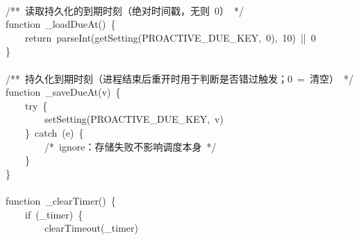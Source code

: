 \documentclass[a4paper,10pt]{article}
\begin{document}
{\mbox{}\\
/**~读取持久化的到期时刻（绝对时间戳，无则~0）~*/\\
function~\_loadDueAt()~\{\\
~~~~return~parseInt(getSetting(PROACTIVE\_DUE\_KEY,~0),~10)~||~0\\
\}\\
\mbox{}\\
/**~持久化到期时刻（进程结束后重开时用于判断是否错过触发；0~=~清空）~*/\\
function~\_saveDueAt(v)~\{\\
~~~~try~\{\\
~~~~~~~~setSetting(PROACTIVE\_DUE\_KEY,~v)\\
~~~~\}~catch~(e)~\{\\
~~~~~~~~/*~ignore：存储失败不影响调度本身~*/\\
~~~~\}\\
\}\\
\mbox{}\\
function~\_clearTimer()~\{\\
~~~~if~(\_timer)~\{\\
~~~~~~~~clearTimeout(\_timer)
}

\newpage
\end{document}

